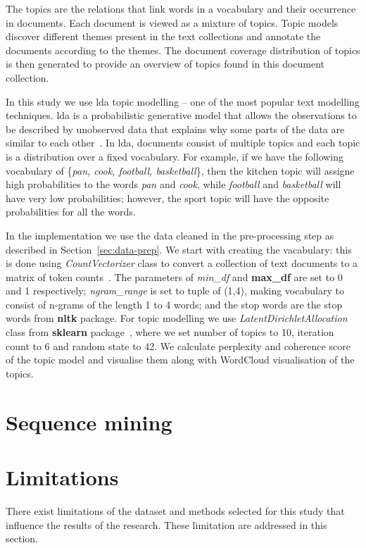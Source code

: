 The topics are the relations that link words in a vocabulary and their occurrence in documents. Each document is viewed as a mixture of topics. Topic models discover different themes present in the text collections and annotate the documents according to the themes. The document coverage distribution of topics is then generated to provide an overview of topics found in this document collection. 

In this study we use \gls{lda} topic modelling -- one of the most popular text modelling techniques. \gls{lda} is a probabilistic generative model that allows the observations to be described by unobserved data that explains why some parts of the data are similar to each other~\cite{tong-topic-modelling}. In \gls{lda}, documents consist of multiple topics and each topic is a distribution over a fixed vocabulary. For example, if we have the  following vocabulary of \{\textit{pan, cook, football, basketball}\}, then the kitchen topic will assigne high probabilities to the words \textit{pan} and \textit{cook}, while \textit{football} and \textit{basketball} will have very low probabilities; however, the sport topic will have the opposite probabilities for all the words. 

In the implementation we use the data cleaned in the pre-processing step as described in Section~\ref{sec:data-prep}. We start with creating the vacabulary: this is done using \textit{CountVectorizer} class to convert a collection of text documents to a matrix of token counts~\cite{scikitlearnCountVectorizer}. The parameters of \textit{min\_df} and \textbf{max\_df} are set to 0 and 1 respectively; \textit{ngram\_range} is set to tuple of (1,4), making vocabulary to consist of n-grams of the length 1 to 4 words; and the stop words are the stop words from \textbf{nltk} package. For topic modelling we use \textit{LatentDirichletAllocation} class from \textbf{sklearn} package~\cite{scikitlearnLatentDirichletAllocation}, where we set number of topics to 10, iteration count to 6 and random state to 42. We calculate perplexity and coherence score of the topic model and visualise them along with WordCloud visualisation of the topics. 

\section{Sequence mining}

\section{Limitations}
There exist limitations of the dataset and methods selected for this study that influence the results of the research. These limitation are addressed in this section. 

